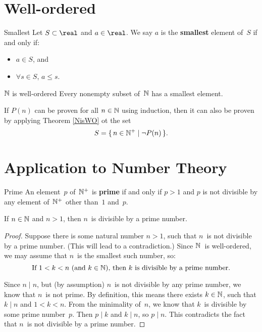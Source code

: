 \documentclass[../MATH-2000-Notes.tex]{subfiles}
\begin{document}
\section{Well-ordered}
\begin{Definition}
    {Smallest}
    Let $S \subset \real$ and $a \in \real$. We say $a$ is the \textbf{smallest} element of~$S$ if and only if:
	\begin{itemize}
	\item $a \in S$,
	and
	\item $\forall s \in S$, $a \le s$.
	\end{itemize}
\end{Definition}

\begin{Theorem}
    {\(\mathbb{N}\) is well-ordered}\label{NisWO}
    Every nonempty subset of~$\mathbb{N}$ has a smallest element.
\end{Theorem}
\begin{Note}
    If \(P(n)\) can be proven for all \(n\in\mathbb{N} \) using induction, then it can also be proven by applying Theorem \ref{NisWO} ot the set \[ S = \{\, n \in \mathbb{N}^+ \mid \neg P(n) \,\} .\]
\end{Note}

\section{Application to Number Theory}
\begin{Definition}
    {Prime}
    An element~$p$ of~$\mathbb{N}^+$ is \textbf{prime} if and only if $p > 1$ and $p$ is not divisible by any element of~$\mathbb{N}^+$ other than~$1$ and~$p$.
\end{Definition}

\begin{Proposition}{} \label{HasPrimeFactor}
    If $n \in \mathbb{N}$ and $n > 1$, then $n$~is divisible by a prime number.
\end{Proposition}
\begin{proof}
    Suppose there is some natural number $n > 1$, such that $n$~is not divisible by a prime number. (This will lead to a contradiction.) Since $\mathbb{N}$~is well-ordered, we may assume that $n$~is the smallest such number, so:
        $$ \text{If $1 < k < n$ (and $k \in \mathbb{N}$), then $k$~is divisible by a prime number} .$$
    
    Since $n \mid n$, but (by assumption) $n$~is not divisible by any prime number, we know that $n$~is not prime. By definition, this means there exists $k \in \mathbb{N}$, such that $k \mid n$ and $1 < k < n$. From the minimality of~$n$, we know that $k$~is divisible by some prime number~$p$. Then $p \mid k$ and $k \mid n$, so $p \mid n$. This contradicts the fact that $n$~is not divisible by a prime number.
\end{proof}
\end{document}

